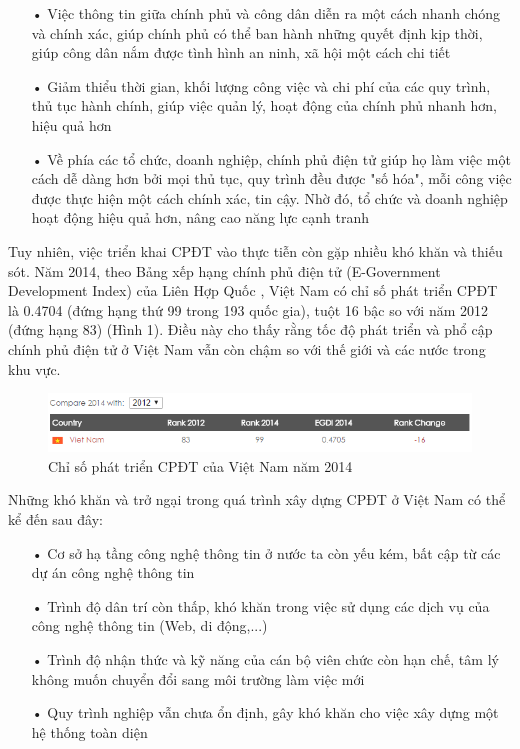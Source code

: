 \documentclass[a4paper]{article}
\begin{document}
\begin{itemize}
	\item[•]Việc thông tin giữa chính phủ và công dân diễn ra một cách nhanh chóng và chính xác, giúp chính phủ có thể ban hành những quyết định kịp thời, giúp công dân nắm được tình hình an ninh, xã hội một cách chi tiết
	\item[•]Giảm thiểu thời gian, khối lượng công việc và chi phí của các quy trình, thủ tục hành chính, giúp việc quản lý, hoạt động của chính phủ nhanh hơn, hiệu quả hơn
	\item[•]Về phía các tổ chức, doanh nghiệp, chính phủ điện tử giúp họ làm việc một cách dễ dàng hơn bởi mọi thủ tục, quy trình đều được "số hóa", mỗi công việc được thực hiện một cách chính xác, tin cậy. Nhờ đó, tổ chức và doanh nghiệp hoạt động hiệu quả hơn, nâng cao năng lực cạnh tranh
\end{itemize}
Tuy nhiên, việc triển khai CPĐT vào thực tiễn còn gặp nhiều khó khăn và thiếu sót. Năm 2014, theo Bảng xếp hạng chính phủ điện tử (E-Government Development Index) của Liên Hợp Quốc \cite{bib3}, Việt Nam có chỉ số phát triển CPĐT là 0.4704 (đứng hạng thứ 99 trong 193 quốc gia), tuột 16 bậc so với năm 2012 (đứng hạng 83) (Hình 1). Điều này cho thấy rằng tốc độ phát triển và phổ cập chính phủ điện tử ở Việt Nam vẫn còn chậm so với thế giới và các nước trong khu vực.
\begin{center}
    \begin{figure}[htp]
    \begin{center}
     \includegraphics[scale=.85]{2014-vietnam-edgi.PNG}
    \end{center}
    \caption{Chỉ số phát triển CPĐT của Việt Nam năm 2014}
    \label{refhinh1}
    \end{figure}
\end{center}
Những khó khăn và trở ngại trong quá trình xây dựng CPĐT ở Việt Nam có thể kể đến sau đây:
\begin{itemize}
	\item[•]Cơ sở hạ tầng công nghệ thông tin ở nước ta còn yếu kém, bất cập từ các dự án công nghệ thông tin
	\item[•]Trình độ dân trí còn thấp, khó khăn trong việc sử dụng các dịch vụ của công nghệ thông tin (Web, di động,...)
	\item[•]Trình độ nhận thức và kỹ năng của cán bộ viên chức còn hạn chế, tâm lý không muốn chuyển đổi sang môi trường làm việc mới
	\item[•]Quy trình nghiệp vẫn chưa ổn định, gây khó khăn cho việc xây dựng một hệ thống toàn diện
\end{itemize}
\end{document}
